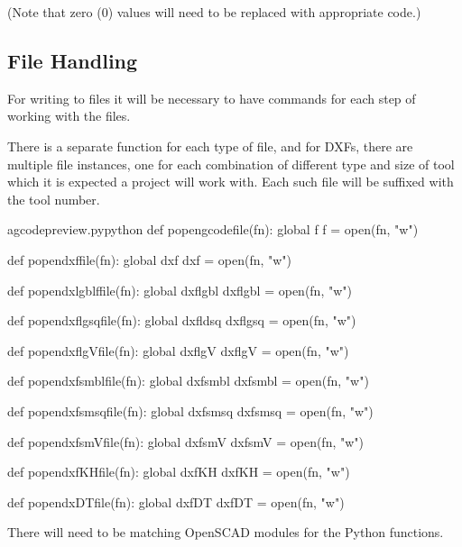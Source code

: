 \documentclass{ltxdoc}
\begin{document}
 
(Note that zero (0) values will need to be replaced with appropriate code.)
 
\subsection{File Handling}
 
For writing to files it will be necessary to have commands for each step of working with the files. 
 
There is a separate function for each type of file, and for DXFs, there are multiple file
instances, one for each combination of different type and size of tool which it is expected 
a project will work with. Each such file will be suffixed with the tool number.

\lstset{firstnumber=\thegcpy}
\begin{writecode}{a}{gcodepreview.py}{python}
def popengcodefile(fn):
    global f
    f = open(fn, "w")

def popendxffile(fn):
    global dxf
    dxf = open(fn, "w")

def popendxlgblffile(fn):
    global dxflgbl
    dxflgbl = open(fn, "w")

def popendxflgsqfile(fn):
    global dxfldsq
    dxflgsq = open(fn, "w")

def popendxflgVfile(fn):
    global dxflgV
    dxflgV = open(fn, "w")

def popendxfsmblfile(fn):
    global dxfsmbl
    dxfsmbl = open(fn, "w")

def popendxfsmsqfile(fn):
    global dxfsmsq
    dxfsmsq = open(fn, "w")

def popendxfsmVfile(fn):
    global dxfsmV
    dxfsmV = open(fn, "w")

def popendxfKHfile(fn):
    global dxfKH
    dxfKH = open(fn, "w")

def popendxDTfile(fn):
    global dxfDT
    dxfDT = open(fn, "w")

\end{writecode}
\addtocounter{gcpy}{40}

There will need to be matching OpenSCAD modules for the Python functions.
\end{document}
